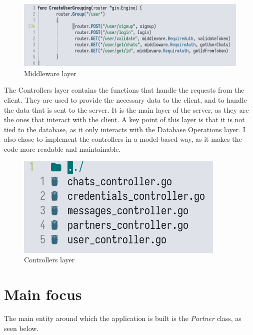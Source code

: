 \begin{figure}[htbp]
    \centering
    \includegraphics[scale=0.4]{pictures/middleware.png}
    \caption{Middleware layer}
    \label{middlewareExample}
\end{figure}

\par
The Controllers layer contains the functions that handle the requests from the client.
They are used to provide the necessary data to the client, and to handle the data that is sent to the server.
It is the main layer of the server, as they are the ones that interact with the client.
A key point of this layer is that it is not tied to the database, as it only interacts with the Database Operations layer.
I also chose to implement the controllers in a model-based way, as it makes the code more readable and maintainable.

\begin{figure}[htbp]
    \centering
    \includegraphics[scale=1.2]{pictures/controllers.png}
    \caption{Controllers layer}
    \label{controllersExample}
\end{figure}

\section{Main focus}
The main entity around which the application is built is the \textit{Partner} class, as seen below.

